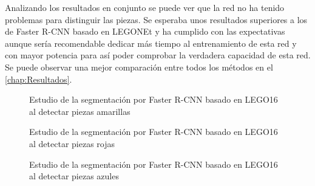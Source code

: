 Analizando los resultados en conjunto se puede ver que la red no ha tenido problemas para distinguir las piezas. Se esperaba unos resultados superiores a los de Faster R-CNN basado en LEGONEt y ha cumplido con las expectativas aunque sería recomendable dedicar más tiempo al entrenamiento de esta red y con mayor potencia para así poder comprobar la verdadera capacidad de esta red. Se puede observar una mejor comparación entre todos los métodos en el \autoref{chap:Resultados}.

\begin{figure}[ht]  %
  \hfill	
\vspace{-5pt}
\caption{Estudio de la segmentación por Faster R-CNN basado en LEGO16 al detectar piezas amarillas}
\label{fig:yellow Faster R-CNN LEGO16}
\end{figure}

\begin{figure}[ht]  %
  \hfill	
\vspace{-5pt}
\caption{Estudio de la segmentación por Faster R-CNN basado en LEGO16 al detectar piezas rojas}
\label{fig:red Faster R-CNN LEGO16}
\end{figure}

\begin{figure}[ht]  %
  \hfill	
\vspace{-5pt}
\caption{Estudio de la segmentación por Faster R-CNN basado en LEGO16 al detectar piezas azules}
\label{fig:blue Faster R-CNN LEGO16}
\end{figure}


